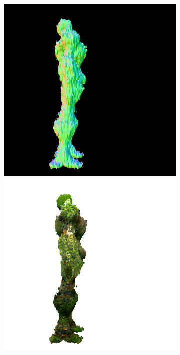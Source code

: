 \begin{figure}[ht]
    \centering
    \begin{subfigure}[b]{0.222\textwidth}
        \centering
        \fontsize{9pt}{7pt}\selectfont{}\vspace{.1cm}
        \includegraphics[width=\textwidth]{etc/a robot made out of plants/magic123/magic123_refine_robot_right_0_part2.png}
        \includegraphics[width=\textwidth]{etc/a robot made out of plants/magic123/magic123_refine_robot_right_0_part1.png}

\end{subfigure}
\end{figure}
